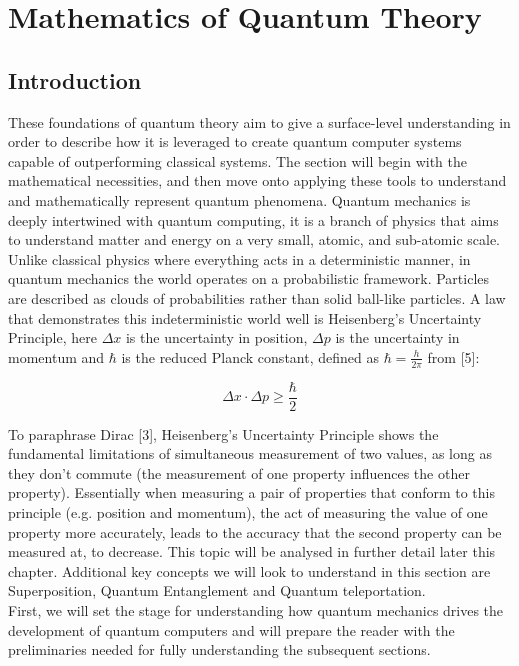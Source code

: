 \chapter{Mathematics of Quantum Theory}

\section{Introduction}

\noindent These foundations of quantum theory aim to give a surface-level understanding in order to describe how it is leveraged to create quantum computer systems capable of outperforming classical systems. The section will begin with the mathematical necessities, and then move onto applying these tools to understand and mathematically represent quantum phenomena. Quantum mechanics is deeply intertwined with quantum computing, it is a branch of physics that aims to understand matter and energy on a very small, atomic, and sub-atomic scale. Unlike classical physics where everything acts in a deterministic manner, in quantum mechanics the world operates on a probabilistic framework. Particles are described as clouds of probabilities rather than solid ball-like particles. A law that demonstrates this indeterministic world well is Heisenberg's Uncertainty Principle, here $\Delta x$ is the uncertainty in position, $\Delta p$ is the uncertainty in momentum and $\hbar$ is the reduced Planck constant, defined as $\hbar = \frac{h}{2\pi}$ from [5]:

\[
\Delta x \cdot \Delta p \geq \frac{\hbar}{2}
\]

\noindent To paraphrase Dirac [3], Heisenberg's Uncertainty Principle shows the fundamental limitations of simultaneous measurement of two values, as long as they don't commute (the measurement of one property influences the other property). Essentially when measuring a pair of properties that conform to this principle (e.g. position and momentum), the act of measuring the value of one property more accurately, leads to the accuracy that the second property can be measured at, to decrease. This topic will be analysed in further detail later this chapter. Additional key concepts we will look to understand in this section are Superposition, Quantum Entanglement and Quantum teleportation.
\\
First, we will set the stage for understanding how quantum mechanics drives the development of quantum computers and will prepare the reader with the preliminaries needed for fully understanding the subsequent sections.



